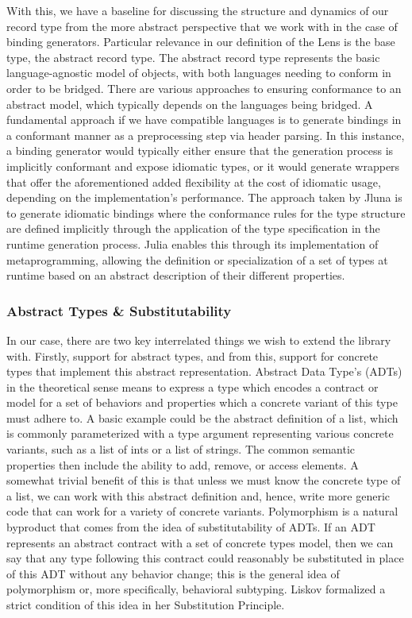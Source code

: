 With this, we have a baseline for discussing the structure and dynamics of our record type from the more abstract perspective that we work with in the case of binding generators. Particular relevance in our definition of the Lens is the base type, \ie the abstract record type. The abstract record type represents the basic language-agnostic model of objects, with both languages needing to conform in order to be bridged. There are various approaches to ensuring conformance to an abstract model, which typically depends on the languages being bridged. A fundamental approach if we have compatible languages is to generate bindings in a conformant manner as a preprocessing step via header parsing. In this instance, a binding generator would typically either ensure that the generation process is implicitly conformant and expose idiomatic types, or it would generate wrappers that offer the aforementioned added flexibility at the cost of idiomatic usage, depending on the implementation's performance. The approach taken by Jluna is to generate idiomatic bindings where the conformance rules for the type structure are defined implicitly through the application of the type specification in the runtime generation process. Julia enables this through its implementation of metaprogramming, allowing the definition or specialization of a set of types at runtime based on an abstract description of their different properties. 

\subsubsection{Abstract Types \& Substitutability}

In our case, there are two key interrelated things we wish to extend the library with. Firstly, support for abstract types, and from this, support for concrete types that implement this abstract representation. Abstract Data Type's (ADTs) in the theoretical sense means to express a type which encodes a contract or model for a set of behaviors and properties which a concrete variant of this type must adhere to. A basic example could be the abstract definition of a list, which is commonly parameterized with a type argument representing various concrete variants, such as a list of ints or a list of strings. The common semantic properties then include the ability to add, remove, or access elements. A somewhat trivial benefit of this is that unless we must know the concrete type of a list, we can work with this abstract definition and, hence, write more generic code that can work for a variety of concrete variants. Polymorphism is a natural byproduct that comes from the idea of substitutability of ADTs. If an ADT represents an abstract contract with a set of concrete types model, then we can say that any type following this contract could reasonably be substituted in place of this ADT without any behavior change; this is the general idea of polymorphism or, more specifically, behavioral subtyping. Liskov formalized a strict condition of this idea in her Substitution Principle. 

